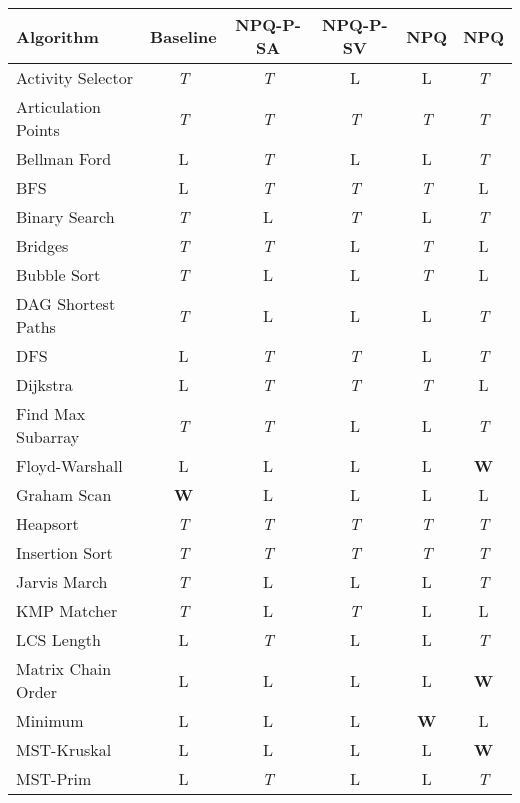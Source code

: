 \documentclass{article}
\theoremstyle{plain}
\theoremstyle{definition}
\theoremstyle{remark}
\begin{document}
\setlength{\tabcolsep}{6pt}


\setlength{\tabcolsep}{4pt}
\begin{table}[tbhp]
\begin{adjustwidth}{-2cm}{-2cm}
\centering
\captionsetup{margin=2cm}
\small
\begin{tabular}{lccccc}
    \hline
    \bfseries Algorithm & \bfseries Baseline & \bfseries NPQ-P-SA & \bfseries NPQ-P-SV & \bfseries NPQ & \bfseries NPQ \\
    \hline
    Activity Selector & \emph{T} & \emph{T} & L & L & \emph{T} \\
    Articulation Points & \emph{T} & \emph{T} & \emph{T} & \emph{T} & \emph{T} \\
    Bellman Ford & L & \emph{T} & L & L & \emph{T} \\
    BFS & L & \emph{T} & \emph{T} & \emph{T} & L \\
    Binary Search & \emph{T} & L & \emph{T} & L & \emph{T} \\
    Bridges & \emph{T} & \emph{T} & L & \emph{T} & L \\
    Bubble Sort & \emph{T} & L & L & \emph{T} & L \\
    DAG Shortest Paths & \emph{T} & L & L & L & \emph{T} \\
    DFS & L & \emph{T} & \emph{T} & L & \emph{T} \\
    Dijkstra & L & \emph{T} & \emph{T} & \emph{T} & L \\
    Find Max Subarray & \emph{T} & \emph{T} & L & L & \emph{T} \\
    Floyd-Warshall & L & L & L & L & \textbf{W} \\
    Graham Scan & \textbf{W} & L & L & L & L \\
    Heapsort & \emph{T} & \emph{T} & \emph{T} & \emph{T} & \emph{T} \\
    Insertion Sort & \emph{T} & \emph{T} & \emph{T} & \emph{T} & \emph{T} \\
    Jarvis March & \emph{T} & L & L & L & \emph{T} \\
    KMP Matcher & \emph{T} & L & \emph{T} & L & L \\
    LCS Length & L & \emph{T} & L & L & \emph{T} \\
    Matrix Chain Order & L & L & L & L & \textbf{W} \\
    Minimum & L & L & L & \textbf{W} & L \\
    MST-Kruskal & L & L & L & L & \textbf{W} \\
    MST-Prim & L & \emph{T} & L & L & \emph{T} \\

\end{tabular}
\end{adjustwidth}
\end{table}
\end{document}
